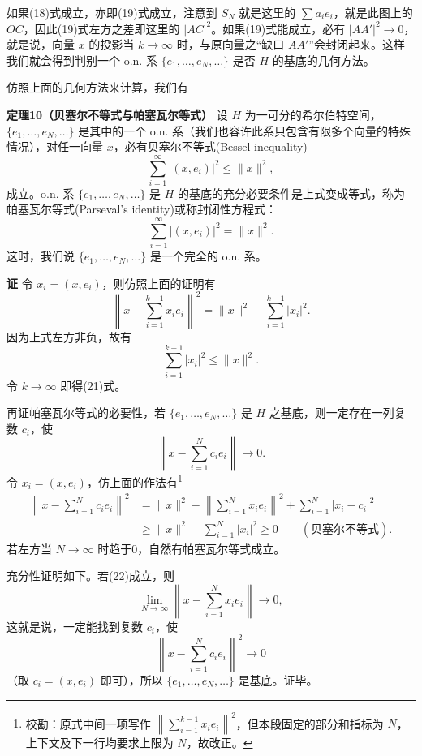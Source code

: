 如果(18)式成立，亦即(19)式成立，注意到 $S_N$ 就是这里的 $\sum a_i e_i$，就是此图上的 $OC$，因此(19)式左方之差即这里的 $|AC|^2$。如果(19)式能成立，必有 $|AA'|^2\to0$，就是说，向量 $x$ 的投影当 $k\to\infty$ 时，与原向量之“缺口 $AA'$”会封闭起来。这样我们就会得到判别一个 o.n. 系 $\{e_1,\ldots,e_N,\ldots\}$ 是否 $H$ 的基底的几何方法。

仿照上面的几何方法来计算，我们有

\noindent\textbf{定理10（贝塞尔不等式与帕塞瓦尔等式）}\quad
设 $H$ 为一可分的希尔伯特空间，$\{e_1,\ldots,e_N,\ldots\}$ 是其中的一个 o.n. 系（我们也容许此系只包含有限多个向量的特殊情况），对任一向量 $x$，必有贝塞尔不等式(Bessel inequality)
\begin{equation}
 \sum_{i=1}^\infty |(x,e_i)|^2\le\|x\|^2,
 \tag{21}
\end{equation}
成立。o.n. 系 $\{e_1,\ldots,e_N,\ldots\}$ 是 $H$ 的基底的充分必要条件是上式变成等式，称为帕塞瓦尔等式(Parseval's identity)或称封闭性方程式：
\begin{equation}
 \sum_{i=1}^\infty |(x,e_i)|^2=\|x\|^2.
 \tag{22}
\end{equation}
这时，我们说 $\{e_1,\ldots,e_N,\ldots\}$ 是一个完全的 o.n. 系。

\noindent\textbf{证}\quad
令 $x_i=(x,e_i)$，则仿照上面的证明有
\[
 \left\|x-\sum_{i=1}^{k-1}x_i e_i\right\|^2
 =\|x\|^2-\sum_{i=1}^{k-1}|x_i|^2.
\]
因为上式左方非负，故有
\[
 \sum_{i=1}^{k-1}|x_i|^2\le\|x\|^2.
\]
令 $k\to\infty$ 即得(21)式。

再证帕塞瓦尔等式的必要性，若 $\{e_1,\ldots,e_N,\ldots\}$ 是 $H$ 之基底，则一定存在一列复数 $c_i$，使
\[
 \left\|x-\sum_{i=1}^N c_i e_i\right\|\to0.
\]
令 $x_i=(x,e_i)$，仿上面的作法有\footnote{校勘：原式中间一项写作 $\left\|\sum_{i=1}^{k-1}x_i e_i\right\|^2$，但本段固定的部分和指标为 $N$，上下文及下一行均要求上限为 $N$，故改正。}
\[
 \begin{aligned}
 \left\|x-\sum_{i=1}^N c_i e_i\right\|^2
 &=\|x\|^2-
 \left\|\sum_{i=1}^{N}x_i e_i\right\|^2
 +\sum_{i=1}^N|x_i-c_i|^2\\
 &\ge\|x\|^2-\sum_{i=1}^N|x_i|^2\ge0
 \qquad(\text{贝塞尔不等式}).
 \end{aligned}
\]
若左方当 $N\to\infty$ 时趋于0，自然有帕塞瓦尔等式成立。

充分性证明如下。若(22)成立，则
\[
 \lim_{N\to\infty}\left\|x-\sum_{i=1}^N x_i e_i\right\|\to0,
\]
这就是说，一定能找到复数 $c_i$，使
\[
 \left\|x-\sum_{i=1}^N c_i e_i\right\|^2\to0
\]
（取 $c_i=(x,e_i)$ 即可），所以 $\{e_1,\ldots,e_N,\ldots\}$ 是基底。证毕。

